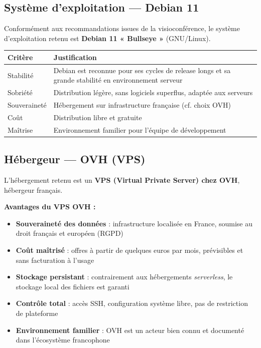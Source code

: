 \documentclass[a4paper,12pt,french]{article}
\begin{document}
\subsection{Système d'exploitation — Debian 11}

Conformément aux recommandations issues de la visioconférence, le système d'exploitation retenu est \textbf{Debian 11 « Bullseye »} (GNU/Linux).

\begin{tabularx}{\textwidth}{l X}
\toprule
\textbf{Critère} & \textbf{Justification} \\
\midrule
Stabilité & Debian est reconnue pour ses cycles de release longs et sa grande stabilité en environnement serveur \\
Sobriété & Distribution légère, sans logiciels superflus, adaptée aux serveurs \\
Souveraineté & Hébergement sur infrastructure française (cf. choix OVH) \\
Coût & Distribution libre et gratuite \\
Maîtrise & Environnement familier pour l'équipe de développement \\
\bottomrule
\end{tabularx}

\subsection{Hébergeur — OVH (VPS)}

L'hébergement retenu est un \textbf{VPS (Virtual Private Server) chez OVH}, hébergeur français.

\textbf{Avantages du VPS OVH :}
\begin{itemize}
  \item \textbf{Souveraineté des données} : infrastructure localisée en France, soumise au droit français et européen (RGPD)
  \item \textbf{Coût maîtrisé} : offres à partir de quelques euros par mois, prévisibles et sans facturation à l'usage
  \item \textbf{Stockage persistant} : contrairement aux hébergements \textit{serverless}, le stockage local des fichiers est garanti
  \item \textbf{Contrôle total} : accès SSH, configuration système libre, pas de restriction de plateforme
  \item \textbf{Environnement familier} : OVH est un acteur bien connu et documenté dans l'écosystème francophone
\end{itemize}
\end{document}
